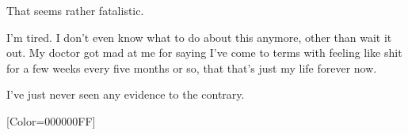 \begin{paracol}{2}
\begin{leftcolumn}
\begin{ally}
That seems rather fatalistic.
\end{ally}
I'm tired. I don't even know what to do about this anymore, other than wait it out. My doctor got mad at me for saying I've come to terms with feeling like shit for a few weeks every five months or so, that that's just my life forever now.

I've just never seen any evidence to the contrary.
\newpage
\end{leftcolumn}
\end{paracol}
\resetbackgroundcolor

\renewfontfamily{}[Color=000000FF]

